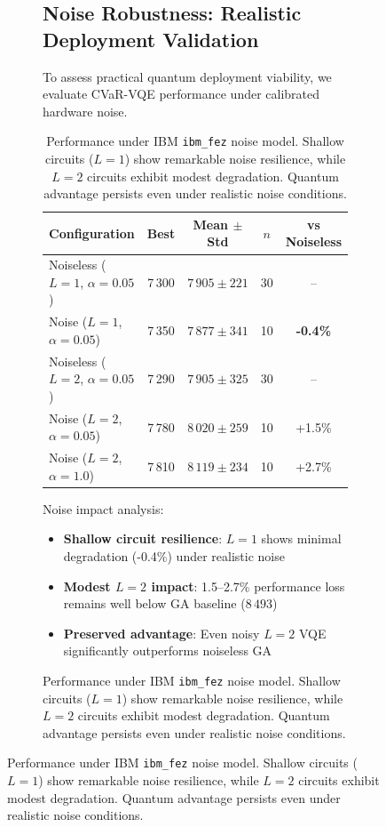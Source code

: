 \begin{figure}[htb]
\begin{figure}[htb]
\subsection{Noise Robustness: Realistic Deployment Validation}

To assess practical quantum deployment viability, we evaluate CVaR-VQE performance under calibrated hardware noise.


\begin{table}[htb]
    \centering
    \caption{Performance under IBM \texttt{ibm\_fez} noise model. Shallow circuits ($L=1$) show remarkable noise resilience, while $L=2$ circuits exhibit modest degradation. Quantum advantage persists even under realistic noise conditions.}
    \label{tab:noise_robustness}
    \begin{tabular}{lcccc}
        \toprule
        Configuration & Best & Mean $\pm$ Std & $n$ & vs Noiseless \\
        \midrule
        Noiseless ($L=1$, $α=0.05$) & 7\,300 & $7\,905 \pm 221$ & 30 & -- \\
        Noise ($L=1$, $α=0.05$) & 7\,350 & $7\,877 \pm 341$ & 10 & \textbf{-0.4\%} \\
        \midrule
        Noiseless ($L=2$, $α=0.05$) & 7\,290 & $7\,905 \pm 325$ & 30 & -- \\
        Noise ($L=2$, $α=0.05$) & 7\,780 & $8\,020 \pm 259$ & 10 & +1.5\% \\
        Noise ($L=2$, $α=1.0$) & 7\,810 & $8\,119 \pm 234$ & 10 & +2.7\% \\
        \bottomrule
    \end{tabular}
\end{table}

Noise impact analysis:
\begin{itemize}[nosep]
    \item \textbf{Shallow circuit resilience}: $L=1$ shows minimal degradation (-0.4\%) under realistic noise
    \item \textbf{Modest $L=2$ impact}: 1.5--2.7\% performance loss remains well below GA baseline ($8\,493$)
    \item \textbf{Preserved advantage}: Even noisy $L=2$ VQE significantly outperforms noiseless GA
\end{itemize}


\end{figure}
\end{figure}
